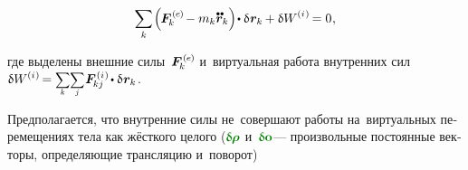 \begin{otherlanguage}{russian}
\nopagebreak\vspace{-0.2em}\begin{equation}\label{discrete:principleofvirtualwork.externalinternal}
\displaystyle \sum_k \hspace{-0.2ex} \left(^{\mathstrut} \hspace{-0.25ex} \bm{F}^{\smthexternal}_{\hspace{-0.16ex}k} \hspace{-0.1ex} - m_k \mathdotdotabove{\locationvector}_k \right) \hspace{-0.32ex} \dotp \variation{\hspace{.1ex}\locationvector_k} \hspace{-0.1ex}
+ \variation{\internalwork} \hspace{-0.1ex} = 0 \hspace{.1ex},
\vspace{-0.25em}\end{equation}

\vspace{-0.1em}\noindent
где выделены внешние силы~${\bm{F}^{\smthexternal}_{\hspace{-0.16ex}k}}$ и~виртуальная работа внутренних сил
${\variation{\internalwork} \hspace{-0.12ex} = \scalebox{0.8}[0.84]{$\displaystyle \underset{\raisemath{.25ex}{\smash{k}}}{\sum}$} \scalebox{0.8}[0.84]{$\displaystyle \underset{\raisemath{.25ex}{\smash{j}}}{\sum}$} \hspace{.12ex} \bm{F}^{\smthinternal}_{\hspace{-0.16ex}kj} \hspace{-0.1ex} \dotp \variation{\hspace{.1ex}\locationvector_k} \hspace{.1ex}}$.

\vspace{-0.1em}
Предполагается, что внутренние силы не~совершают работы на~виртуальных перемещениях тела как жёсткого целого (${\constvarvector{\hspace{-0.1ex}\bm{\rho}}}$ и~${\constvarvector{\bm{o}}}$\:--- произвольные постоянные векторы, определяющие трансляцию и~поворот)


\end{otherlanguage}

